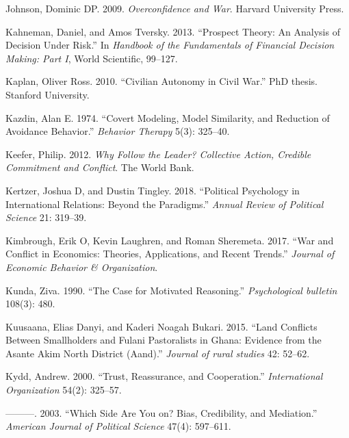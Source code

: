 \documentclass[11pt]{article}
\begin{document}
\leavevmode\hypertarget{ref-johnson2009overconfidence}{}%
Johnson, Dominic DP. 2009. \emph{Overconfidence and War}. Harvard
University Press.

\leavevmode\hypertarget{ref-kahneman2013prospect}{}%
Kahneman, Daniel, and Amos Tversky. 2013. ``Prospect Theory: An Analysis
of Decision Under Risk.'' In \emph{Handbook of the Fundamentals of
Financial Decision Making: Part I}, World Scientific, 99--127.

\leavevmode\hypertarget{ref-kaplan2010civilian}{}%
Kaplan, Oliver Ross. 2010. ``Civilian Autonomy in Civil War.''
PhD thesis. Stanford University.

\leavevmode\hypertarget{ref-kazdin1974covertModeling}{}%
Kazdin, Alan E. 1974. ``Covert Modeling, Model Similarity, and Reduction
of Avoidance Behavior.'' \emph{Behavior Therapy} 5(3): 325--40.

\leavevmode\hypertarget{ref-keefer2012follow}{}%
Keefer, Philip. 2012. \emph{Why Follow the Leader? Collective Action,
Credible Commitment and Conflict}. The World Bank.

\leavevmode\hypertarget{ref-kertzer2018political}{}%
Kertzer, Joshua D, and Dustin Tingley. 2018. ``Political Psychology in
International Relations: Beyond the Paradigms.'' \emph{Annual Review of
Political Science} 21: 319--39.

\leavevmode\hypertarget{ref-kimbrough2017war}{}%
Kimbrough, Erik O, Kevin Laughren, and Roman Sheremeta. 2017. ``War and
Conflict in Economics: Theories, Applications, and Recent Trends.''
\emph{Journal of Economic Behavior \& Organization}.

\leavevmode\hypertarget{ref-kunda1990motivatedReasoning}{}%
Kunda, Ziva. 1990. ``The Case for Motivated Reasoning.''
\emph{Psychological bulletin} 108(3): 480.

\leavevmode\hypertarget{ref-kuusaana2015land}{}%
Kuusaana, Elias Danyi, and Kaderi Noagah Bukari. 2015. ``Land Conflicts
Between Smallholders and Fulani Pastoralists in Ghana: Evidence from the
Asante Akim North District (Aand).'' \emph{Journal of rural studies} 42:
52--62.

\leavevmode\hypertarget{ref-kydd2000trust}{}%
Kydd, Andrew. 2000. ``Trust, Reassurance, and Cooperation.''
\emph{International Organization} 54(2): 325--57.

\leavevmode\hypertarget{ref-kydd2003side}{}%
---------. 2003. ``Which Side Are You on? Bias, Credibility, and
Mediation.'' \emph{American Journal of Political Science} 47(4):
597--611.
\end{document}
